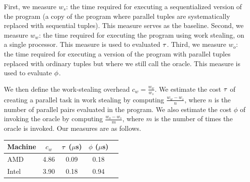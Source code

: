 First, we measure $w_s$: the time required for executing a
sequentialized version of the program (a copy of the program where
parallel tuples are systematically replaced with sequential tuples).
This measure serves as the baseline.  Second, we measure $w_w$: the
time required for executing the program using work stealing, on a
single processor.  This measure is used to evaluated ${\tau}$.  Third,
we measure $w_o$: the time required for executing a version of the
program with parallel tuples replaced with ordinary tuples but where
we still call the oracle. %
This measure is used to evaluate ${\phi}$.

We then define the work-stealing overhead $c_w = \frac{w_w}{w_s}$.
We estimate the cost ${\tau}$ of creating a parallel task in work stealing
by computing $\frac{w_w - w_s}{n}$, where
$n$ is the number of parallel pairs evaluated in the program.
We also estimate the cost $\phi$ of invoking the oracle  by computing $\frac{w_o - w_s}{m}$,
where $m$ is the number of times the oracle is invoked.
Our measures are as follows.
%
\begin{center}
\begin{tabular}{l | c c c c}
Machine & $c_w$  &  ${\tau}$ ($\mu$s) & $\phi$ ($\mu$s) \\
\hline
AMD   & 4.86   & 0.09  & 0.18 \\
Intel & 3.90  &  0.18  & 0.94 \\
\end{tabular}
\end{center}

